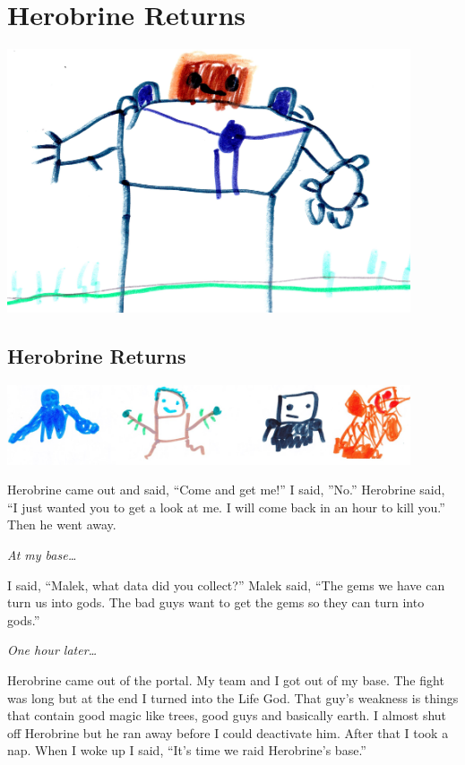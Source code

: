 \documentclass[letterpaper, oneside, 12pt]{krantz}
\begin{document}
\hypertarget{herobrine-returns}{%
\chapter{Herobrine Returns}\label{herobrine-returns}}

\includegraphics[width=4.6875in,height=\textheight]{img/herobrine-returns/1-herobrine-medium.jpg}

\clearpage

\hypertarget{herobrine-returns-1}{%
\section{Herobrine Returns}\label{herobrine-returns-1}}

\includegraphics[width=4.6875in,height=\textheight]{img/herobrine-returns/3-gods.jpg}

Herobrine came out and said, ``Come and get me!'' I said, ''No.''
Herobrine said, ``I just wanted you to get a look at me. I will come
back in an hour to kill you.'' Then he went away.

\emph{At my base\ldots{}}

I said, ``Malek, what data did you collect?'' Malek said, ``The gems we
have can turn us into gods. The bad guys want to get the gems so they
can turn into gods.''

\emph{One hour later\ldots{}}

Herobrine came out of the portal. My team and I got out of my base. The
fight was long but at the end I turned into the Life God. That guy's
weakness is things that contain good magic like trees, good guys and
basically earth. I almost shut off Herobrine but he ran away before I
could deactivate him. After that I took a nap. When I woke up I said,
``It's time we raid Herobrine's base.''
\end{document}
